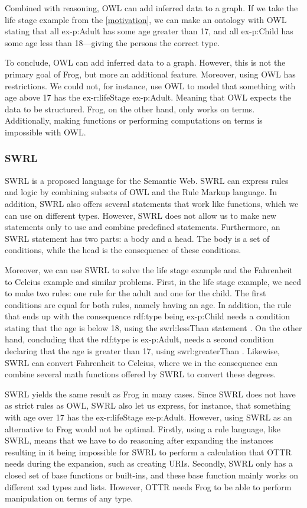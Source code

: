 \para
Combined with reasoning, OWL can add inferred data to a graph. If we take the life stage example from the \autoref{motivation}, we can make an ontology with OWL stating that all ex-p:Adult has some age greater than 17, and all ex-p:Child has some age less than 18—giving the persons the correct type.

\para 
To conclude, OWL can add inferred data to a graph. However, this is not the primary goal of Frog, but more an additional feature. Moreover, using OWL has restrictions. We could not, for instance, use OWL to model that something with age above 17 has the ex-r:lifeStage ex-p:Adult. Meaning that OWL expects the data to be structured. Frog, on the other hand, only works on terms. Additionally, making functions or performing computations on terms is impossible with OWL.

\subsubsection{SWRL}
SWRL \autocite{SWRL} is a proposed language for the Semantic Web. SWRL can express rules and logic by combining subsets of OWL and the Rule Markup language. In addition, SWRL also offers several statements that work like functions, which we can use on different types. However, SWRL does not allow us to make new statements only to use and combine predefined statements. Furthermore, an SWRL statement has two parts: a body and a head. The body is a set of conditions, while the head is the consequence of these conditions.

\para
Moreover, we can use SWRL to solve the life stage example and the Fahrenheit to Celcius example and similar problems. First, in the life stage example, we need to make two rules: one rule for the adult and one for the child. The first conditions are equal for both rules, namely having an age. In addition, the rule that ends up with the consequence rdf:type being ex-p:Child needs a condition stating that the age is below 18, using the swrl:lessThan statement \autocite{SWRL}.  On the other hand, concluding that the rdf:type is ex-p:Adult, needs a second condition declaring that the age is greater than 17, using swrl:greaterThan \autocite{SWRL}. Likewise, SWRL can convert Fahrenheit to Celcius, where we in the consequence can combine several math functions offered by SWRL to convert these degrees.

\para
SWRL yields the same result as Frog in many cases. Since SWRL does not have as strict rules as OWL, SWRL also let us express, for instance, that something with age over 17 has the ex-r:lifeStage ex-p:Adult. However, using SWRL as an alternative to Frog would not be optimal. Firstly, using a rule language, like SWRL, means that we have to do reasoning after expanding the instances resulting in it being impossible for SWRL to perform a calculation that OTTR needs during the expansion, such as creating URIs. Secondly, SWRL only has a closed set of base functions or built-ins, and these base function mainly works on different xsd types and lists. However, OTTR needs Frog to be able to perform manipulation on terms of any type.

